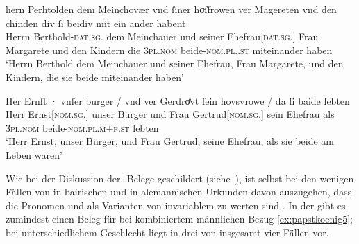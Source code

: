 \begin{exe}
\ex \label{ex:m+f_si_beide_iu}
	\begin{xlist}
	\ex \label{ex:m+f_si_beidiu}
		\gll hern Perhtolden dem Meinchovær vnd ſiner hoͮſfrowen ver Magereten
				vnd den chinden div ſi beidiv {mit ein ander} habent \\
			Herrn Berthold-\textsc{dat.sg.\MascM} dem Meinchauer und seiner
				Ehefrau[\textsc{dat.sg.\FemF}] Frau Margarete und den Kindern
				die \textsc{3pl\subMF.nom} beide-\textsc{nom.pl.\NeutMF.st}
				miteinander haben \\
		\trans `Herrn Berthold dem Meinchauer und seiner Ehefrau, Frau
			Margarete, und den Kindern, die sie beide miteinander haben'
			\parencites(Nr.~937, Regensburg, 1287)[292,40--41]{cao2}

	\ex \label{ex:m+f_si_beide}
		\gll Her Ernſt · vnſer burger / vnd ver Gerdroͤvt ſein hovsvrowe / da
				ſi baide lebten \\
			Herr Ernst[\textsc{nom.sg.\MascM}] {} unser Bürger {} und Frau
				Gertrud[\textsc{nom.sg.\FemF}] sein Ehefrau {} als
				\textsc{3pl\subMF.nom} beide-\textsc{nom.pl.m+f\subMF.st}
				lebten \\
		\trans `Herr Ernst, unser Bürger, und Frau Gertrud, seine Ehefrau,
			als sie beide am Leben waren'
			\parencites(Nr.~1073, Wien, 1289)[374,40--41]{cao2}
	\end{xlist}
\end{exe}

Wie bei der Diskussion der \CAO{}-Belege geschildert
(siehe~), ist selbst bei den wenigen Fällen von
 in bairischen und  in alemannischen Urkunden
davon auszugehen, dass die Pronomen  und  als Varianten von
invariablem  zu werten sind \autocite[vgl.][394--396]{ksw2}. In der
\KC{} gibt es zumindest einen Beleg für  bei kombiniertem
männlichen Bezug \cref{ex:papstkoenig5}; bei unterschiedlichem Geschlecht liegt
 in drei von insgesamt vier Fällen vor.

